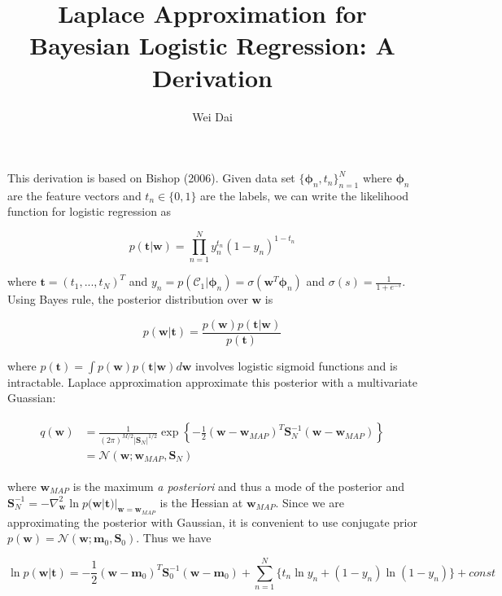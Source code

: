 \documentclass{article}
\newcommand{\phib}{\bm{\phi}}
\begin{document}
\title{Laplace Approximation for Bayesian Logistic Regression: A Derivation}
\author{Wei Dai}

\maketitle

This derivation is based on Bishop (2006). Given data set $\{\phib_n,
t_n\}_{n=1}^N$ where $\phib_n$ are the feature vectors and $t_n\in \{0,1\}$
are the labels, we can write the likelihood function for logistic regression
as

\begin{equation}
p(\bm{t}|\bm{w}) = \prod_{n=1}^N y_n^{t_n} (1-y_n)^{1-t_n}
\end{equation}

where $\bm{t} = (t_1,...,t_N)^T$ and $y_n=p(\mathcal{C}_1|\phib_n) =
\sigma(\bm{w}^T \phib_n)$ and $\sigma(s) = \frac{1}{1+e^{-s}}$. Using Bayes
rule, the posterior distribution over $\bm{w}$ is

\begin{equation}
p(\bm{w}|\bm{t}) = \frac{p(\bm{w}) p(\bm{t}|\bm{w})}{p(\bm{t})}
\end{equation}

where $p(\bm{t}) = \int p(\bm{w})p(\bm{t}|\bm{w}) d\bm{w}$ involves logistic
sigmoid functions and is intractable.  Laplace approximation approximate this
posterior with a multivariate Guassian: 

\begin{align}
\begin{split}
q(\bm{w})
&=\frac{1}{(2\pi)^{M/2} |\bm{S}_N|^{1/2}} \exp\left\{ -\frac{1}{2}
(\bm{w} - \bm{w}_{MAP})^T \bm{S}_N^{-1} (\bm{w} - \bm{w}_{MAP}) \right\}
\\
&= \mathcal{N}(\bm{w}; \bm{w}_{MAP}, \bm{S}_N)
\end{split}
\end{align}


where $\bm{w}_{MAP}$ is the maximum {\it a posteriori} and thus a mode of the
posterior and $\bm{S}_N^{-1} = -\nabla^2_{\bm{w}} \ln
p(\bm{w}|\bm{t})|_{\bm{w} = \bm{w}_{MAP}}$
is the Hessian at $\bm{w}_{MAP}$.  Since we are approximating the posterior
with Gaussian, it is convenient to use conjugate prior $p(\bm{w}) =
\mathcal{N}(\bm{w};\bm{m}_0,\bm{S}_0)$. Thus we have

\begin{equation}
\label{eq:objective}
\ln p(\bm{w}|\bm{t}) = -\frac{1}{2}(\bm{w}-\bm{m}_0)^T
\bm{S}_0^{-1}(\bm{w}-\bm{m}_0) + \sum_{n=1}^N\{t_n \ln y_n +(1-y_n) \ln
(1-y_n)\} + const
\end{equation}
\end{document}
